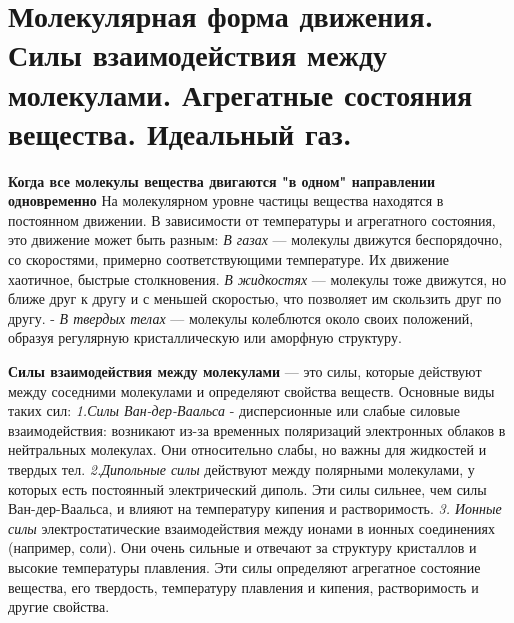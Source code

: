\documentclass[14pt]{article}
\begin{document}
    \section{Молекулярная форма движения. Силы взаимодействия между молекулами. Агрегатные состояния вещества. Идеальный газ.}
    \textbf{Когда все молекулы вещества двигаются "в одном" направлении одновременно}
    \newline На молекулярном уровне частицы вещества  находятся в постоянном движении. В зависимости от температуры и агрегатного состояния, это движение может быть разным: 
    \newline \textit{В газах}  — молекулы движутся беспорядочно, со скоростями, примерно соответствующими температуре. Их движение хаотичное, быстрые столкновения. 
    \newline \textit{ В жидкостях} — молекулы тоже движутся, но ближе друг к другу и с меньшей скоростью, что позволяет им скользить друг по другу. -
    \newline \textit{В твердых телах}  — молекулы колеблются около своих положений, образуя регулярную кристаллическую или аморфную структуру.
    
    \textbf{Силы взаимодействия между молекулами} — это силы, которые действуют между соседними молекулами и определяют свойства веществ.
     Основные виды таких сил:
    \newline \textit{1.Силы Ван-дер-Ваальса} - дисперсионные или слабые силовые взаимодействия: возникают из-за временных поляризаций электронных облаков в нейтральных молекулах. Они относительно слабы, но важны для жидкостей и твердых тел. 
    \newline \textit{2.Дипольные силы} действуют между полярными молекулами, у которых есть постоянный электрический диполь. Эти силы сильнее, чем силы Ван-дер-Ваальса, и влияют на температуру кипения и растворимость. 
    \newline \textit{3. Ионные силы } электростатические взаимодействия между ионами в ионных соединениях (например, соли). Они очень сильные и отвечают за структуру кристаллов и высокие температуры плавления.
    Эти силы определяют агрегатное состояние вещества, его твердость, температуру плавления и кипения, растворимость и другие свойства.
\end{document}
